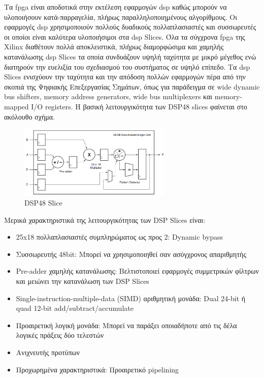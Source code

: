 Τα \gls{fpga} είναι αποδοτικά στην εκτέλεση εφαρμογών \gls{dsp} καθώς μπορούν να υλοποιήσουν κατά-παρραγελία, πλήρως παραλληλοποιημένους αλγορίθμους. Οι εφαρμογές \gls{dsp} χρησιμοποιούν πολλούς δυαδικούς πολλαπλασιαστές και συσσωρευτές οι οποίοι είναι καλύτερα υλοποιήσιμοι στα \gls{dsp} Slices. Όλα τα σύγχρονα \gls{fpga} της Xilinx διαθέτουν πολλά αποκλειστικά, πλήρως διαμορφώσιμα και χαμηλής κατανάλωσης \gls{dsp} Slices τα οποία συνδυάζουν υψηλή ταχύτητα με μικρό μέγεθος ενώ διατηρούν την ευελιξία του σχεδιασμού του συστήματος σε υψηλό επίπεδο. Τα \gls{dsp} Slices ενισχύουν την ταχύτητα και την απόδοση πολλών εφαρμογών πέρα από την σκοπιά της Ψηφιακής Επεξεργασίας Σημάτων, όπως για παράδειγμα σε wide dynamic bus shifters, memory address generators, wide bus multiplexers και memory-mapped I/O registers. Η βασική λειτουργικότητα των DSP48 slices φαίνεται στο ακόλουθο σχήμα.
\begin{figure}[H]
  	\centering
	\includegraphics[width=0.65\textwidth]{images/dsp48}
	\caption{DSP48 Slice \cite{DSP48}}
	\label{fig:DSP48}
\end{figure}
Μερικά χαρακτηριστικά της λειτουργικότητας των DSP Slices είναι:
\begin{itemize}
	\item 25x18 πολλαπλασιαστές συμπληρώματος ως προς 2:
	\subitem Dynamic bypass
	\item Συσσωρευτής 48bit:
	\subitem Μπορεί να χρησιμοποιηθεί σαν ασύγχρονος απαριθμητής
	\item Pre-adder χαμηλής κατανάλωσης:
	\subitem Βελτιστοποιεί εφαρμογές συμμετρικών φίλτρων και μειώνει την κατανάλωση των DSP Slices
	\item Single-instruction-multiple-data (SIMD) αριθμητική μονάδα:
	\subitem Dual 24-bit ή quad 12-bit add/subtract/accumulate
	\item Προαιρετική λογική μονάδα:
	\subitem Μπορεί να παράξει οποιαδήποτε από τις δέλα λογικές πράξεις δύο τελεστών
	\item Ανιχνευτής προτύπων
	\item Προχωρημένα χαρακτηριστικά:
	\subitem Προαιρετικό pipelining
\end{itemize}
